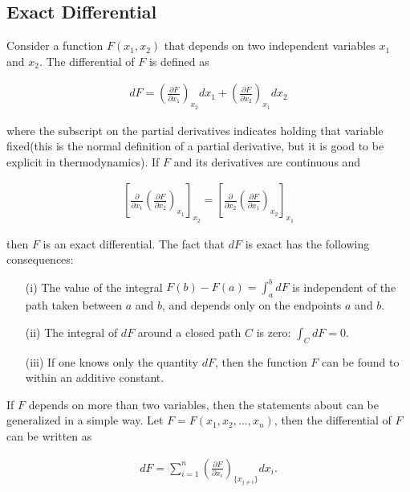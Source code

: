 \documentclass{article}
\numberwithin{theorem}{subsection}
\numberwithin{theorem}{subsubsection}
\theoremstyle{definition}
\numberwithin{definition}{subsection}
\numberwithin{definition}{subsubsection}
\begin{document}
\subsection{Exact Differential}
\indent Consider a function $F(x_{1},x_{2})$ that depends on two independent variables $x_{1}$ and $x_{2}$. The differential of $F$ is defined as

\begin{gather*}
    dF = \left ( \frac{\partial F}{\partial x_{1}} \right )_{x_{2}} dx_{1} + \left ( \frac{\partial F}{\partial x_{2}} \right )_{x_{1}} dx_{2} 
\end{gather*}

\noindent where the subscript on the partial derivatives indicates holding that variable fixed(this is the normal definition of a partial derivative, but it is good to be explicit in thermodynamics). If $F$ and its derivatives are continuous and 

\begin{gather*}
    \left [ \frac{\partial}{\partial x_{1}}\left ( \frac{\partial F}{\partial x_{2}} \right )_{x_{1}}\right ]_{x_{2}} = \left [ \frac{\partial}{\partial x_{2}}\left ( \frac{\partial F}{\partial x_{1}} \right )_{x_{2}}\right ]_{x_{1}}
\end{gather*}

\noindent then $F$ is an exact differential. The fact that $dF$ is exact has the following consequences:

\begin{itemize}
    \item[(i)] The value of the integral $F(b) - F(a) = \int_{a}^{b} dF$ is independent of the path taken between $a$ and $b$, and depends only on the endpoints $a$ and $b$.
    \item[(ii)] The integral of $dF$ around a closed path $C$ is zero: $\int_{C} dF = 0.$
    \item[(iii)] If one knows only the quantity $dF$, then the function $F$ can be found to within an additive constant.
\end{itemize}

\indent If $F$ depends on more than two variables, then the statements about can be generalized in a simple way. Let $F = F(x_{1},x_{2},...,x_{n})$, then the differential of $F$ can be written as

\begin{gather*}
    dF = \sum_{i = 1}^{n} \left ( \frac{\partial F}{\partial x_{i}} \right )_{\{x_{j \neq i}\}}dx_{i}.
\end{gather*}
\end{document}
